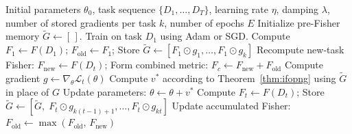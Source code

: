 \begin{algorithm}[htbp]
\caption{preIFOPNG Algorithm~\citep{garg_fisher-orthogonal_2026},
       adapted for the iFOPNG combined metric}
\label{alg:prefisher}
\small
\setlength{\abovedisplayskip}{2pt}
\setlength{\belowdisplayskip}{2pt}
\begin{algorithmic}[1]
\Require Initial parameters $\theta_0$, task sequence $\{D_1,\ldots,D_T\}$,
              learning rate $\eta$, damping $\lambda$,
              number of stored gradients per task $k$, number of epochs $E$
\State Initialize pre-Fisher memory $\tilde{G} \leftarrow [\,]$.
       Train on task $D_1$ using Adam or SGD.
\State Compute $F_1 \leftarrow F(D_1)$;\quad
       $F_{\mathrm{old}} \leftarrow F_1$;\quad
       Store $\tilde{G} \leftarrow [F_1 \odot g_1, \ldots, F_1 \odot g_k]$
              \State Recompute new-task Fisher:
                     $F_{\mathrm{new}} \leftarrow F(D_t)$;
              \State Form combined metric:
                     $F_c \leftarrow F_{\mathrm{new}} + F_{\mathrm{old}}$
              \State Compute gradient $g \leftarrow \nabla_\theta \mathcal{L}_t(\theta)$
              \State Compute $v^*$ according to Theorem~\ref{thm:ifopng}
                     using $\tilde{G}$ in place of $G$
              \State Update parameters: $\theta \leftarrow \theta + v^*$
              \EndFor
       \EndFor
       \State Compute $F_t \leftarrow F(D_t)$;\quad
              Store $\tilde{G} \leftarrow
              [\tilde{G},\; F_t \odot g_{k(t-1)+1},
              \ldots, F_t \odot g_{kt}]$
       \State Update accumulated Fisher:
              $F_{\mathrm{old}} \leftarrow
              \max\!\left(F_{\mathrm{old}},\, F_{\mathrm{new}}\right)$
\EndFor
\end{algorithmic}
\end{algorithm}